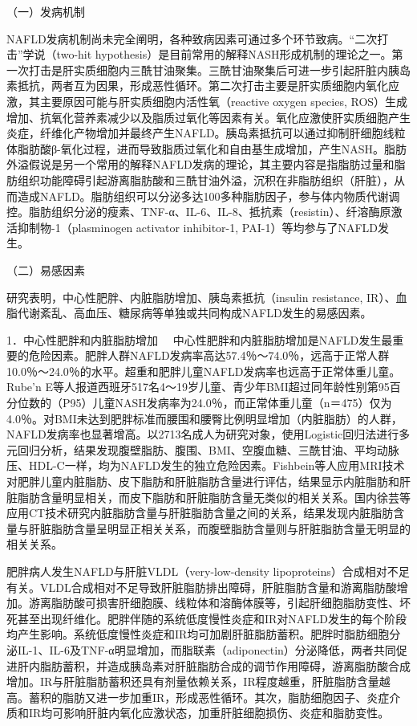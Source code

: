 （一）发病机制

NAFLD发病机制尚未完全阐明，各种致病因素可通过多个环节致病。“二次打击”学说（two-hit
hypothesis）是目前常用的解释NASH形成机制的理论之一。第一次打击是肝实质细胞内三酰甘油聚集。三酰甘油聚集后可进一步引起肝脏内胰岛素抵抗，两者互为因果，形成恶性循环。第二次打击主要是肝实质细胞内氧化应激，其主要原因可能与肝实质细胞内活性氧（reactive
oxygen species,
ROS）生成增加、抗氧化营养素减少以及脂质过氧化等因素有关。氧化应激使肝实质细胞产生炎症，纤维化产物增加并最终产生NAFLD。胰岛素抵抗可以通过抑制肝细胞线粒体脂肪酸β-氧化过程，进而导致脂质过氧化和自由基生成增加，产生NASH。脂肪外溢假说是另一个常用的解释NAFLD发病的理论，其主要内容是指脂肪过量和脂肪组织功能障碍引起游离脂肪酸和三酰甘油外溢，沉积在非脂肪组织（肝脏），从而造成NAFLD。脂肪组织可以分泌多达100多种脂肪因子，参与体内物质代谢调控。脂肪组织分泌的瘦素、TNF-α、IL-6、IL-8、抵抗素（resistin）、纤溶酶原激活抑制物-1（plasminogen
activator inhibitor-1, PAI-1）等均参与了NAFLD发生。

（二）易感因素

研究表明，中心性肥胖、内脏脂肪增加、胰岛素抵抗（insulin resistance,
IR）、血脂代谢紊乱、高血压、糖尿病等单独或共同构成NAFLD发生的易感因素。

{1．中心性肥胖和内脏脂肪增加}
　中心性肥胖和内脏脂肪增加是NAFLD发生最重要的危险因素。肥胖人群NAFLD发病率高达57.4％～74.0％，远高于正常人群10.0％～24.0％的水平。超重和肥胖儿童NAFLD发病率也远高于正常体重儿童。Rube'n
E等人报道西班牙517名4～19岁儿童、青少年BMI超过同年龄性别第95百分位数的（P95）儿童NASH发病率为24.0％，而正常体重儿童（n＝475）仅为4.0％。对BMI未达到肥胖标准而腰围和腰臀比例明显增加（内脏脂肪）的人群，NAFLD发病率也显著增高。以2713名成人为研究对象，使用Logistic回归法进行多元回归分析，结果发现腹壁脂肪、腹围、BMI、空腹血糖、三酰甘油、平均动脉压、HDL-C一样，均为NAFLD发生的独立危险因素。Fishbein等人应用MRI技术对肥胖儿童内脏脂肪、皮下脂肪和肝脏脂肪含量进行评估，结果显示内脏脂肪和肝脏脂肪含量明显相关，而皮下脂肪和肝脏脂肪含量无类似的相关关系。国内徐芸等应用CT技术研究内脏脂肪含量与肝脏脂肪含量之间的关系，结果发现内脏脂肪含量与肝脏脂肪含量呈明显正相关关系，而腹壁脂肪含量则与肝脏脂肪含量无明显的相关关系。

肥胖病人发生NAFLD与肝脏VLDL（very-low-density
lipoproteins）合成相对不足有关。VLDL合成相对不足导致肝脏脂肪排出障碍，肝脏脂肪含量和游离脂肪酸增加。游离脂肪酸可损害肝细胞膜、线粒体和溶酶体膜等，引起肝细胞脂肪变性、坏死甚至出现纤维化。肥胖伴随的系统低度慢性炎症和IR对NAFLD发生的每个阶段均产生影响。系统低度慢性炎症和IR均可加剧肝脏脂肪蓄积。肥胖时脂肪细胞分泌IL-1、IL-6及TNF-α明显增加，而脂联素（adiponectin）分泌降低，两者共同促进肝内脂肪蓄积，并造成胰岛素对肝脏脂肪合成的调节作用障碍，游离脂肪酸合成增加。IR与肝脏脂肪蓄积还具有剂量依赖关系，IR程度越重，肝脏脂肪含量越高。蓄积的脂肪又进一步加重IR，形成恶性循环。其次，脂肪细胞因子、炎症介质和IR均可影响肝脏内氧化应激状态，加重肝脏细胞损伤、炎症和脂肪变性。

